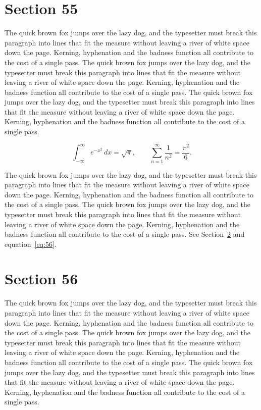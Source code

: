 \documentclass{article}
\begin{document}
\section{Section 55}
\label{sec:55}
The quick brown fox jumps over the lazy dog, and the typesetter must break this paragraph into lines that fit the measure without leaving a river of white space down the page. Kerning, hyphenation and the badness function all contribute to the cost of a single pass. The quick brown fox jumps over the lazy dog, and the typesetter must break this paragraph into lines that fit the measure without leaving a river of white space down the page. Kerning, hyphenation and the badness function all contribute to the cost of a single pass. The quick brown fox jumps over the lazy dog, and the typesetter must break this paragraph into lines that fit the measure without leaving a river of white space down the page. Kerning, hyphenation and the badness function all contribute to the cost of a single pass. 

\begin{equation}\label{eq:55}
\int_{-\infty}^{\infty} e^{-x^{2}}\,dx = \sqrt{\pi}, \qquad
\sum_{n=1}^{\infty} \frac{1}{n^{2}} = \frac{\pi^{2}}{6}.
\end{equation}

The quick brown fox jumps over the lazy dog, and the typesetter must break this paragraph into lines that fit the measure without leaving a river of white space down the page. Kerning, hyphenation and the badness function all contribute to the cost of a single pass. The quick brown fox jumps over the lazy dog, and the typesetter must break this paragraph into lines that fit the measure without leaving a river of white space down the page. Kerning, hyphenation and the badness function all contribute to the cost of a single pass. 
See Section~\ref{sec:56} and equation~\eqref{eq:56}.
\section{Section 56}
\label{sec:56}
The quick brown fox jumps over the lazy dog, and the typesetter must break this paragraph into lines that fit the measure without leaving a river of white space down the page. Kerning, hyphenation and the badness function all contribute to the cost of a single pass. The quick brown fox jumps over the lazy dog, and the typesetter must break this paragraph into lines that fit the measure without leaving a river of white space down the page. Kerning, hyphenation and the badness function all contribute to the cost of a single pass. The quick brown fox jumps over the lazy dog, and the typesetter must break this paragraph into lines that fit the measure without leaving a river of white space down the page. Kerning, hyphenation and the badness function all contribute to the cost of a single pass. 
\end{document}
